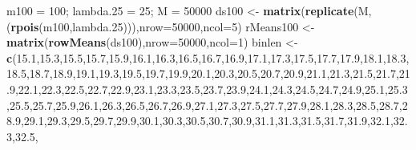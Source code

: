 \documentclass[
]{article}
\newenvironment{Shaded}{\begin{snugshade}}{\end{snugshade}}
\newcommand{\DataTypeTok}[1]{\textcolor[rgb]{0.13,0.29,0.53}{#1}}
\newcommand{\DecValTok}[1]{\textcolor[rgb]{0.00,0.00,0.81}{#1}}
\newcommand{\FloatTok}[1]{\textcolor[rgb]{0.00,0.00,0.81}{#1}}
\newcommand{\KeywordTok}[1]{\textcolor[rgb]{0.13,0.29,0.53}{\textbf{#1}}}
\newcommand{\NormalTok}[1]{#1}
\newcommand{\StringTok}[1]{\textcolor[rgb]{0.31,0.60,0.02}{#1}}
\begin{document}
\begin{Shaded}
\begin{Highlighting}[]
\NormalTok{m100 =}\StringTok{ }\DecValTok{100}\NormalTok{; lambda}\FloatTok{.25}\NormalTok{ =}\StringTok{ }\DecValTok{25}\NormalTok{; M =}\StringTok{ }\DecValTok{50000}
\NormalTok{ds100 <-}\StringTok{ }\KeywordTok{matrix}\NormalTok{(}\KeywordTok{replicate}\NormalTok{(M,(}\KeywordTok{rpois}\NormalTok{(m100,lambda}\FloatTok{.25}\NormalTok{))),}\DataTypeTok{nrow=}\DecValTok{50000}\NormalTok{,}\DataTypeTok{ncol=}\DecValTok{5}\NormalTok{)}
\NormalTok{rMeans100 <-}\StringTok{ }\KeywordTok{matrix}\NormalTok{(}\KeywordTok{rowMeans}\NormalTok{(ds100),}\DataTypeTok{nrow=}\DecValTok{50000}\NormalTok{,}\DataTypeTok{ncol=}\DecValTok{1}\NormalTok{)}
\NormalTok{binlen <-}\StringTok{ }\KeywordTok{c}\NormalTok{(}\FloatTok{15.1}\NormalTok{,}\FloatTok{15.3}\NormalTok{,}\FloatTok{15.5}\NormalTok{,}\FloatTok{15.7}\NormalTok{,}\FloatTok{15.9}\NormalTok{,}\FloatTok{16.1}\NormalTok{,}\FloatTok{16.3}\NormalTok{,}\FloatTok{16.5}\NormalTok{,}\FloatTok{16.7}\NormalTok{,}\FloatTok{16.9}\NormalTok{,}\FloatTok{17.1}\NormalTok{,}\FloatTok{17.3}\NormalTok{,}\FloatTok{17.5}\NormalTok{,}\FloatTok{17.7}\NormalTok{,}\FloatTok{17.9}\NormalTok{,}\FloatTok{18.1}\NormalTok{,}\FloatTok{18.3}\NormalTok{,}\FloatTok{18.5}\NormalTok{,}\FloatTok{18.7}\NormalTok{,}\FloatTok{18.9}\NormalTok{,}\FloatTok{19.1}\NormalTok{,}\FloatTok{19.3}\NormalTok{,}\FloatTok{19.5}\NormalTok{,}\FloatTok{19.7}\NormalTok{,}\FloatTok{19.9}\NormalTok{,}\FloatTok{20.1}\NormalTok{,}\FloatTok{20.3}\NormalTok{,}\FloatTok{20.5}\NormalTok{,}\FloatTok{20.7}\NormalTok{,}\FloatTok{20.9}\NormalTok{,}\FloatTok{21.1}\NormalTok{,}\FloatTok{21.3}\NormalTok{,}\FloatTok{21.5}\NormalTok{,}\FloatTok{21.7}\NormalTok{,}\FloatTok{21.9}\NormalTok{,}\FloatTok{22.1}\NormalTok{,}\FloatTok{22.3}\NormalTok{,}\FloatTok{22.5}\NormalTok{,}\FloatTok{22.7}\NormalTok{,}\FloatTok{22.9}\NormalTok{,}\FloatTok{23.1}\NormalTok{,}\FloatTok{23.3}\NormalTok{,}\FloatTok{23.5}\NormalTok{,}\FloatTok{23.7}\NormalTok{,}\FloatTok{23.9}\NormalTok{,}\FloatTok{24.1}\NormalTok{,}\FloatTok{24.3}\NormalTok{,}\FloatTok{24.5}\NormalTok{,}\FloatTok{24.7}\NormalTok{,}\FloatTok{24.9}\NormalTok{,}\FloatTok{25.1}\NormalTok{,}\FloatTok{25.3}\NormalTok{,}\FloatTok{25.5}\NormalTok{,}\FloatTok{25.7}\NormalTok{,}\FloatTok{25.9}\NormalTok{,}\FloatTok{26.1}\NormalTok{,}\FloatTok{26.3}\NormalTok{,}\FloatTok{26.5}\NormalTok{,}\FloatTok{26.7}\NormalTok{,}\FloatTok{26.9}\NormalTok{,}\FloatTok{27.1}\NormalTok{,}\FloatTok{27.3}\NormalTok{,}\FloatTok{27.5}\NormalTok{,}\FloatTok{27.7}\NormalTok{,}\FloatTok{27.9}\NormalTok{,}\FloatTok{28.1}\NormalTok{,}\FloatTok{28.3}\NormalTok{,}\FloatTok{28.5}\NormalTok{,}\FloatTok{28.7}\NormalTok{,}\FloatTok{28.9}\NormalTok{,}\FloatTok{29.1}\NormalTok{,}\FloatTok{29.3}\NormalTok{,}\FloatTok{29.5}\NormalTok{,}\FloatTok{29.7}\NormalTok{,}\FloatTok{29.9}\NormalTok{,}\FloatTok{30.1}\NormalTok{,}\FloatTok{30.3}\NormalTok{,}\FloatTok{30.5}\NormalTok{,}\FloatTok{30.7}\NormalTok{,}\FloatTok{30.9}\NormalTok{,}\FloatTok{31.1}\NormalTok{,}\FloatTok{31.3}\NormalTok{,}\FloatTok{31.5}\NormalTok{,}\FloatTok{31.7}\NormalTok{,}\FloatTok{31.9}\NormalTok{,}\FloatTok{32.1}\NormalTok{,}\FloatTok{32.3}\NormalTok{,}\FloatTok{32.5}\NormalTok{,}\
\end{Highlighting}
\end{Shaded}
\end{document}
